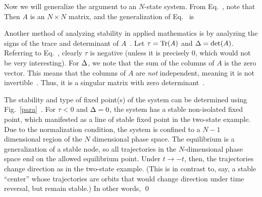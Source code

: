 {	Now we will generalize the argument to an $N$-state system.  From Eq.~, note that
	Then $A$ is an $N \times N$ matrix,
	and the generalization of Eq.~ is
	
	Another method of analyzing stability in applied mathematics is by analyzing the signs of the trace and determinant of $A$~\cite[pp.~136--137]{Strogatz}.  Let $\tau = \Tr(A)$ and $\Delta = \det(A)$.  Referring to Eq.~, clearly $\tau$ is negative (unless it is precisely 0, which would not be very interesting).  For $\Delta$, we note that the sum of the columns of $A$ is the zero vector.  This means that the columns of $A$ are \emph{not} independent, meaning it is not invertible~\cite{Invertible}.  Thus, it is a singular matrix with zero determinant~\cite{Singular}.
	
	The stability and type of fixed point(s) of the system can be determined using Fig.~\ref{para}~\cite[p.~137]{Strogatz}.  For $\tau < 0$ and $\Delta = 0$, the system has a stable non-isolated fixed point, which manifested as a line of stable fixed point in the two-state example.  Due to the normalization condition, the system is confined to a $N - 1$ dimensional region of the $N$ dimensional phase space.  The equilibrium is a generalization of a stable node, so all trajectories in the $N$-dimensional phase space end on the allowed equilibrium point.  Under $t \to -t$, then, the trajectories change direction as in the two-state example.  (This is in contrast to, say, a stable ``center'' whose trajectories are orbits that would change direction under time reversal, but remain stable.)  In other words,  \qed
}

